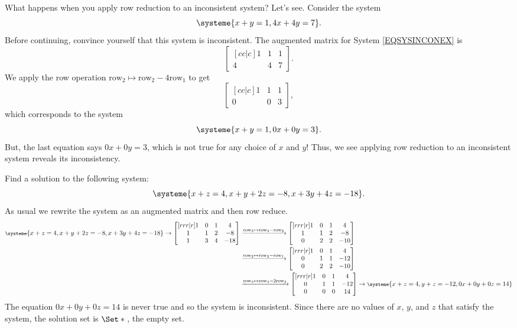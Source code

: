 	What happens when you apply row reduction to an inconsistent system? Let's see. Consider the system
	\begin{equation}
		\label{EQSYSINCONEX}
		\systeme{x+y=1,4x+4y=7}.
	\end{equation}
	Before continuing, convince yourself that this system is inconsistent.
	The augmented matrix for System \eqref{EQSYSINCONEX} is
	\[
		\begin{bmatrix}[cc|c]1&1&1\\4&4&7\end{bmatrix}.
	\]
	We apply the row operation $\text{row}_2\mapsto \text{row}_2-4\text{row}_1$ to get
	\[
		\begin{bmatrix}[cc|c]1&1&1\\0&0&3\end{bmatrix},
	\]
	which corresponds to the system
	\[
		\systeme{x+y=1,0x+0y=3}.
	\]
	But, the last equation says $0x+0y=3$, which is not true for any choice of $x$ and $y$!
	Thus, we see applying row reduction to an inconsistent system reveals its inconsistency.

	\begin{example}
		Find a solution to the following system:
		\[
			\systeme{
				x+z=4,
				x+y+2z=-8,
				x+3y+4z=-18
			}.
		\]
		As usual we rewrite the system as an augmented matrix and then row reduce.
		\begin{align*}
			{\footnotesize
			\systeme{
				x+z=4,
				x+y+2z=-8,
				x+3y+4z=-18
			}
			} \rightarrow
			\begin{bmatrix}[rrr|r]
				1&0&1 & 4\\
				1&1&2 & -8\\
				1&3&4 & -18
			\end{bmatrix}
			&\xrightarrow{\text{row}_3\mapsto\text{row}_3-\text{row}_2}
			\begin{bmatrix}[rrr|r]
				1&0&1 & 4\\
				1&1&2 & -8\\
				0&2&2 & -10
			\end{bmatrix}\\
			&\xrightarrow{\text{row}_2\mapsto\text{row}_2-\text{row}_1}
			\begin{bmatrix}[rrr|r]
				1&0&1 & 4\\
				0&1&1 & -12\\
				0&2&2 & -10
			\end{bmatrix}\\
			&\xrightarrow{\text{row}_3\mapsto\text{row}_3-2\text{row}_2}
			\begin{bmatrix}[rrr|r]
				1&0&1 & 4\\
				0&1&1 & -12\\
				0&0&0 & 14
			\end{bmatrix}
			\rightarrow
			{\footnotesize
				\systeme{
				x+z=4,
				y+z=-12,
				0x+0y+0z=14
				}
			}
		\end{align*}
		The equation $0x + 0y + 0z = 14$ is never true and so the system is inconsistent.
		Since there are no values of $x$, $y$, and $z$ that satisfy the system, the solution set is $\Set*{}$, the empty set.
	\end{example}
